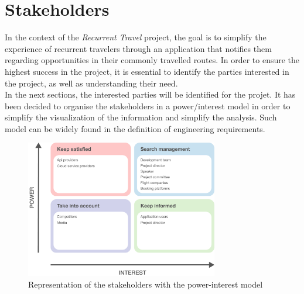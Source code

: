 \documentclass[../memory.tex]{subfiles}
\begin{document}
\section{Stakeholders}
In the context of the \emph{Recurrent Travel} project, the goal is to simplify
the experience of recurrent travelers through an application that notifies them
regarding opportunities in their commonly travelled routes. In order to ensure
the highest success in the project, it is essential to identify the parties
interested in the project, as well as understanding their need.
\\
In the next sections, the interested parties will be identified for the projet.
It has been decided to organise the stakeholders in a power/interest
model\cite{stakeholders-power-interest} in order to simplify the visualization of
the information and simplify the analysis. Such model can be widely found in
the definition of engineering requirements.
\begin{figure}[H]
	\centering
	\includegraphics[width=0.75\textwidth]{./assets/stakeholders.png}
	\caption{Representation of the stakeholders with the power-interest model}
\end{figure}
\end{document}
